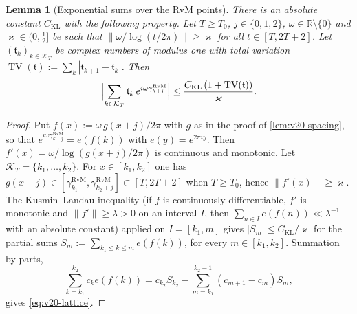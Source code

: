\documentclass[11pt,a4paper]{article}
\numberwithin{equation}{section}
\newtheorem{lemma}[theorem]{Lemma}
\theoremstyle{definition}
\theoremstyle{remark}
\begin{document}
\begin{lemma}[Exponential sums over the RvM points]\label{lem:v20-lattice}
There is an absolute constant $C_{\mathrm{KL}}$ with the following property. Let $T\ge T_0$, $j\in\{0,1,2\}$, $\omega\in\mathbb R\setminus\{0\}$ and $\varkappa\in(0,\frac12]$ be such that $\|\omega/\log(t/2\pi)\|\ge\varkappa$ for all $t\in[T,2T+2]$. Let $(\mathfrak t_k)_{k\in\mathcal K_T}$ be complex numbers of modulus one with total variation $\operatorname{TV}(\mathfrak t):=\sum_k|\mathfrak t_{k+1}-\mathfrak t_k|$. Then
\begin{equation}\label{eq:v20-lattice}
 \Bigl|\sum_{k\in\mathcal K_T}\mathfrak t_k\,e^{i\omega\gamma^{\mathrm{RvM}}_{k+j}}\Bigr|\le\frac{C_{\mathrm{KL}}\,(1+\operatorname{TV}(\mathfrak t))}{\varkappa}.
\end{equation}
\end{lemma}
\begin{proof}
Put $f(x):=\omega\,g(x+j)/2\pi$ with $g$ as in the proof of \cref{lem:v20-spacing}, so that $e^{i\omega\gamma^{\mathrm{RvM}}_{k+j}}=e(f(k))$ with $e(y)=e^{2\pi iy}$. Then $f'(x)=\omega/\log(g(x+j)/2\pi)$ is continuous and monotonic. Let $\mathcal K_T=\{k_1,\dots,k_2\}$. For $x\in[k_1,k_2]$ one has $g(x+j)\in[\gamma^{\mathrm{RvM}}_{k_1},\gamma^{\mathrm{RvM}}_{k_2+j}]\subset[T,2T+2]$ when $T\ge T_0$, hence $\|f'(x)\|\ge\varkappa$. The Kusmin--Landau inequality \cite[Thm.~2.1, p.~7]{GrahamKolesnik1991} (if $f$ is continuously differentiable, $f'$ is monotonic and $\|f'\|\ge\lambda>0$ on an interval $I$, then $\sum_{n\in I}e(f(n))\ll\lambda^{-1}$ with an absolute constant) applied on $I=[k_1,m]$ gives $|S_m|\le C_{\mathrm{KL}}/\varkappa$ for the partial sums $S_m:=\sum_{k_1\le k\le m}e(f(k))$, for every $m\in[k_1,k_2]$. Summation by parts,
\begin{equation}
 \sum_{k=k_1}^{k_2}c_ke(f(k))=c_{k_2}S_{k_2}-\sum_{m=k_1}^{k_2-1}(c_{m+1}-c_m)S_m,
\end{equation}
gives \eqref{eq:v20-lattice}.
\end{proof}
\end{document}
